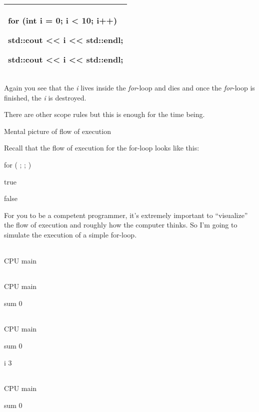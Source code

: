 \documentclass[
]{article}
\begin{document}
\begin{longtable}[]{@{}l@{}}
\toprule
\endhead
\begin{minipage}[t]{0.97\columnwidth}\raggedright
for (int i = 0; i \textless{} 10; i++)

std::cout \textless\textless{} i \textless\textless{} std::endl;

std::cout \textless\textless{} i \textless\textless{} std::endl;\strut
\end{minipage}\tabularnewline
\bottomrule
\end{longtable}

Again you see that the \emph{i} lives inside the \emph{for}-loop and
dies and once the \emph{for}-loop is finished, the \emph{i} is
destroyed.

There are other scope rules but this is enough for the time being.

Mental picture of flow of execution

Recall that the flow of execution for the for-loop looks like this:

for ( ; ; )

true

false

For you to be a competent programmer, it's extremely important to
``visualize'' the flow of execution and roughly how the computer thinks.
So I'm going to simulate the execution of a simple for-loop.

\begin{longtable}[]{@{}@{}}
\toprule
\endhead
\bottomrule
\end{longtable}

CPU main

\begin{longtable}[]{@{}@{}}
\toprule
\endhead
\bottomrule
\end{longtable}

CPU main

sum 0

\begin{longtable}[]{@{}@{}}
\toprule
\endhead
\bottomrule
\end{longtable}

CPU main

sum 0

i 3

\begin{longtable}[]{@{}@{}}
\toprule
\endhead
\bottomrule
\end{longtable}

CPU main

sum 0
\end{document}
